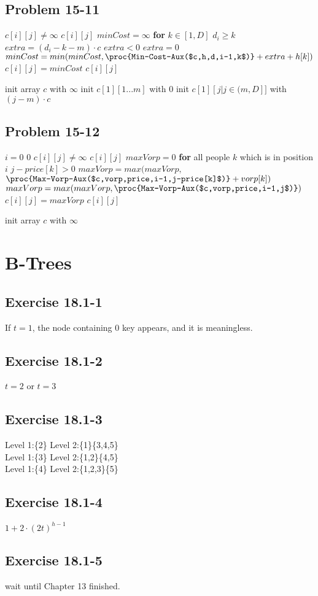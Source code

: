 \documentclass[12pt]{article}
\theoremstyle{definition}
\theoremstyle{remark}
\begin{document}
\subsection*{Problem 15-11}
\begin{codebox}
\li \If $c[i][j]\ne \infty$ \label{li:if}
\li \quad \Return $c[i][j]$
\li $minCost=\infty$
\li \textbf{for} $k\in [1,D]$
\li \quad \If $d_i\ge k$ \label{li:if}
\li \qquad $extra=(d_i-k-m)\cdot c$
\li \qquad \If $extra<0$ \label{li:if}
\li \quad \qquad $extra=0$
\li \qquad $minCost=min(minCost,\proc{Min-Cost-Aux($c,h,d,i-1,k$)}+extra+h[k])$
\li $c[i][j]=minCost$
\li \Return $c[i][j]$
\end{codebox}
\begin{codebox}
\li init array $c$ with $\infty$
\li init $c[1][1...m]$ with $0$
\li init $c[1][j|j\in(m,D]]$ with $(j-m)\cdot c$
\li \Return {}
\end{codebox}
\subsection*{Problem 15-12}
\begin{codebox}
\li \If $i=0$ \label{li:if}
\li \quad \Return $0$
\li \If $c[i][j]\ne \infty$ \label{li:if}
\li \quad \Return $c[i][j]$
\li $maxVorp=0$
\li \textbf{for} all people $k$ which is in position $i$
\li \quad \If $j-price[k]>0$ \label{li:if}
\li \qquad $maxVorp=max(maxVorp,$
\li \qquad $\proc{Max-Vorp-Aux($c,vorp,price,i-1,j-price[k]$)}+vorp[k])$
\li \quad $maxVorp=max(maxVorp,\proc{Max-Vorp-Aux($c,vorp,price,i-1,j$)})$
\li $c[i][j]=maxVorp$
\li \Return $c[i][j]$
\end{codebox}
\begin{codebox}
\li init array $c$ with $\infty$
\li \Return {}
\end{codebox}
\section{B-Trees}
\subsection*{Exercise 18.1-1}
If $t=1$, the node containing $0$ key appears, and it is meaningless.
\subsection*{Exercise 18.1-2}
$t=2$ or $t=3$
\subsection*{Exercise 18.1-3}
Level 1:\{2\} Level 2:\{1\}\{3,4,5\}\\
Level 1:\{3\} Level 2:\{1,2\}\{4,5\}\\
Level 1:\{4\} Level 2:\{1,2,3\}\{5\}\\
\subsection*{Exercise 18.1-4}
$1+2\cdot (2t)^{h-1}$
\subsection*{Exercise 18.1-5}
wait until Chapter 13 finished.
\end{document}
